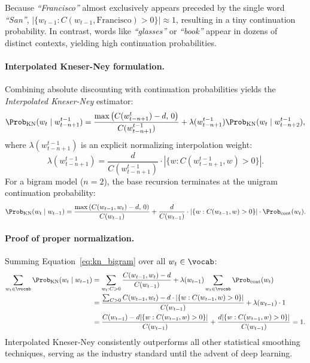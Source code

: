 \documentclass[../../main.tex]{subfiles}
\begin{document}
Because \textit{``Francisco''} almost exclusively appears preceded by the single word \textit{``San''}, $|\{ w_{t-1} : C(w_{t-1}, \text{Francisco}) > 0 \}| \approx 1$, resulting in a tiny continuation probability. In contrast, words like \textit{``glasses''} or \textit{``book''} appear in dozens of distinct contexts, yielding high continuation probabilities.

\paragraph{Interpolated Kneser-Ney formulation.}
Combining absolute discounting with continuation probabilities yields the \emph{Interpolated Kneser-Ney} estimator:
\begin{equation}
\label{eq:kneser_ney}
\Prob_{\text{KN}}(w_t \mid w_{t-n+1}^{t-1}) = \frac{\max\left( C(w_{t-n+1}^t) - d, \, 0 \right)}{C(w_{t-n+1}^{t-1})} + \lambda(w_{t-n+1}^{t-1}) \Prob_{\text{KN}}(w_t \mid w_{t-n+2}^{t-1}),
\end{equation}
where $\lambda(w_{t-n+1}^{t-1})$ is an explicit normalizing interpolation weight:
\begin{equation}
\label{eq:kn_lambda}
\lambda(w_{t-n+1}^{t-1}) = \frac{d}{C(w_{t-n+1}^{t-1})} \cdot \left| \{ w : C(w_{t-n+1}^{t-1}, w) > 0 \} \right|.
\end{equation}
For a bigram model ($n=2$), the base recursion terminates at the unigram continuation probability:
\begin{equation}
\label{eq:kn_bigram}
\Prob_{\text{KN}}(w_t \mid w_{t-1}) = \frac{\max\left( C(w_{t-1}, w_t) - d, \, 0 \right)}{C(w_{t-1})} + \frac{d}{C(w_{t-1})} \cdot \left| \{ w : C(w_{t-1}, w) > 0 \} \right| \cdot \Prob_{\text{cont}}(w_t).
\end{equation}

\paragraph{Proof of proper normalization.}
Summing Equation~\eqref{eq:kn_bigram} over all $w_t \in \vocab$:
\begin{align}
\sum_{w_t \in \vocab} \Prob_{\text{KN}}(w_t \mid w_{t-1}) &= \sum_{w_t : C > 0} \frac{C(w_{t-1}, w_t) - d}{C(w_{t-1})} + \lambda(w_{t-1}) \sum_{w_t \in \vocab} \Prob_{\text{cont}}(w_t) \notag \\
&= \frac{\sum_{C > 0} C(w_{t-1}, w_t) - d \cdot |\{ w : C(w_{t-1}, w) > 0 \}|}{C(w_{t-1})} + \lambda(w_{t-1}) \cdot 1 \notag \\
&= \frac{C(w_{t-1}) - d |\{ w : C(w_{t-1}, w) > 0 \}|}{C(w_{t-1})} + \frac{d |\{ w : C(w_{t-1}, w) > 0 \}|}{C(w_{t-1})} = 1. \label{eq:kn_proof}
\end{align}
Interpolated Kneser-Ney consistently outperforms all other statistical smoothing techniques, serving as the industry standard until the advent of deep learning.
\end{document}
